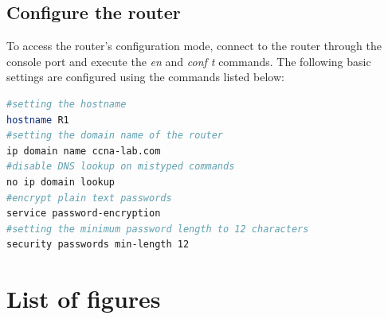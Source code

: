 \documentclass[a4paper]{article}
\newcommand{\abc}{\hfill \break}
\newcommand{\ii}{\textit}
\begin{document}
\subsection{Configure the router}
To access the router's configuration mode, connect to the router through the console port and execute the \ii{en} and \ii{conf t} commands.\abc
The following basic settings are configured using the commands listed below:
\begin{lstlisting}[language=bash]
#setting the hostname
hostname R1
#setting the domain name of the router
ip domain name ccna-lab.com
#disable DNS lookup on mistyped commands
no ip domain lookup
#encrypt plain text passwords
service password-encryption
#setting the minimum password length to 12 characters
security passwords min-length 12
\end{lstlisting}

\newpage
\section{List of figures}

\listoffigures
\end{document}
